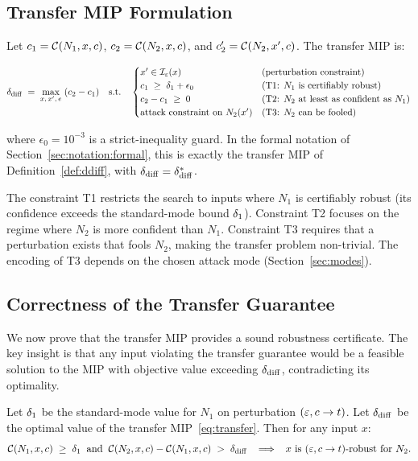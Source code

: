 \subsection{Transfer MIP Formulation}

Let $c_1 = \mathcal{C}(N_1,x,c)$, $c_2 = \mathcal{C}(N_2,x,c)$, and $c_2' = \mathcal{C}(N_2,x',c)$.
The transfer MIP is:

\begin{equation}
  \label{eq:transfer}
  \delta_{\mathrm{diff}} \;=\; \max_{x,\,x',\,e}\; (c_2 - c_1)
  \quad\text{s.t.}\quad
  \begin{cases}
    x' \in \mathcal{I}_\varepsilon(x) & \text{(perturbation constraint)} \\
    c_1 \;\ge\; \delta_1 + \epsilon_0 & \text{(T1: $N_1$ is certifiably robust)} \\
    c_2 - c_1 \;\ge\; 0 & \text{(T2: $N_2$ at least as confident as $N_1$)} \\
    \text{attack constraint on } N_2(x') & \text{(T3: $N_2$ can be fooled)}
  \end{cases}
\end{equation}

where $\epsilon_0 = 10^{-3}$ is a strict-inequality guard. In the formal notation of Section~\ref{sec:notation:formal}, this is exactly the transfer MIP of Definition~\ref{def:ddiff}, with $\delta_{\mathrm{diff}} = \delta_{\mathrm{diff}}^{*}$.

The constraint T1 restricts the search to inputs where $N_1$ is certifiably robust (its confidence exceeds the standard-mode bound $\delta_1$). Constraint T2 focuses on the regime where $N_2$ is more confident than $N_1$. Constraint T3 requires that a perturbation exists that fools $N_2$, making the transfer problem non-trivial. The encoding of T3 depends on the chosen attack mode (Section~\ref{sec:modes}).

\subsection{Correctness of the Transfer Guarantee}

We now prove that the transfer MIP provides a sound robustness certificate. The key insight is that any input violating the transfer guarantee would be a feasible solution to the MIP with objective value exceeding $\delta_{\mathrm{diff}}$, contradicting its optimality.

\begin{theorem}
  \label{thm:transfer}
  Let $\delta_1$ be the standard-mode value for $N_1$ on perturbation $(\varepsilon, c \to t)$. Let $\delta_{\mathrm{diff}}$ be the optimal value of the transfer MIP~\eqref{eq:transfer}. Then for any input $x$:
  \[
    \mathcal{C}(N_1,x,c) \;\ge\; \delta_1
    \;\;\text{and}\;\;
    \mathcal{C}(N_2,x,c) - \mathcal{C}(N_1,x,c) \;>\; \delta_{\mathrm{diff}}
    \;\;\implies\;\; x \text{ is } (\varepsilon,c\to t)\text{-robust for } N_2.
  \]
\end{theorem}

